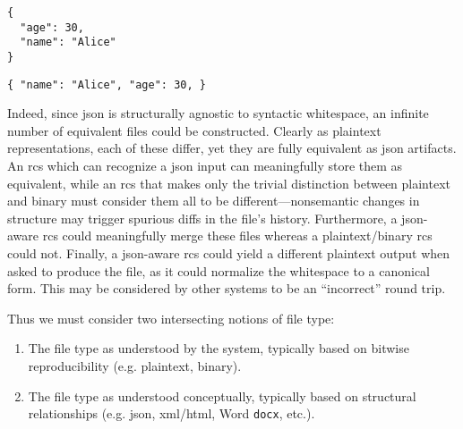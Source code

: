\documentclass[twoside]{article}
\begin{document}
\begin{lstlisting}[style=listingcode]
{
  "age": 30,
  "name": "Alice"
}
\end{lstlisting}

\begin{lstlisting}[style=listingcode]
{ "name": "Alice", "age": 30, }
\end{lstlisting}

Indeed, since {\sc json} is structurally agnostic to syntactic whitespace, an infinite number of equivalent files could be constructed.  Clearly as plaintext representations, each of these differ, yet they are fully equivalent as {\sc json} artifacts.  An {\sc rcs} which can recognize a {\sc json} input can meaningfully store them as equivalent, while an {\sc rcs} that makes only the trivial distinction between plaintext and binary must consider them all to be different—nonsemantic changes in structure may trigger spurious diffs in the file's history.  Furthermore, a {\sc json}-aware {\sc rcs} could meaningfully merge these files whereas a plaintext/binary {\sc rcs} could not.  Finally, a {\sc json}-aware {\sc rcs} could yield a different plaintext output when asked to produce the file, as it could normalize the whitespace to a canonical form.  This may be considered by other systems to be an ``incorrect'' round trip.

Thus we must consider two intersecting notions of file type:
\begin{enumerate}
  \item The file type as understood by the system, typically based on bitwise reproducibility (e.g. plaintext, binary).
  \item The file type as understood conceptually, typically based on structural relationships (e.g. {\sc json}, {\sc xml}/{\sc html}, Word \texttt{docx}, etc.).
\end{enumerate}
\end{document}
